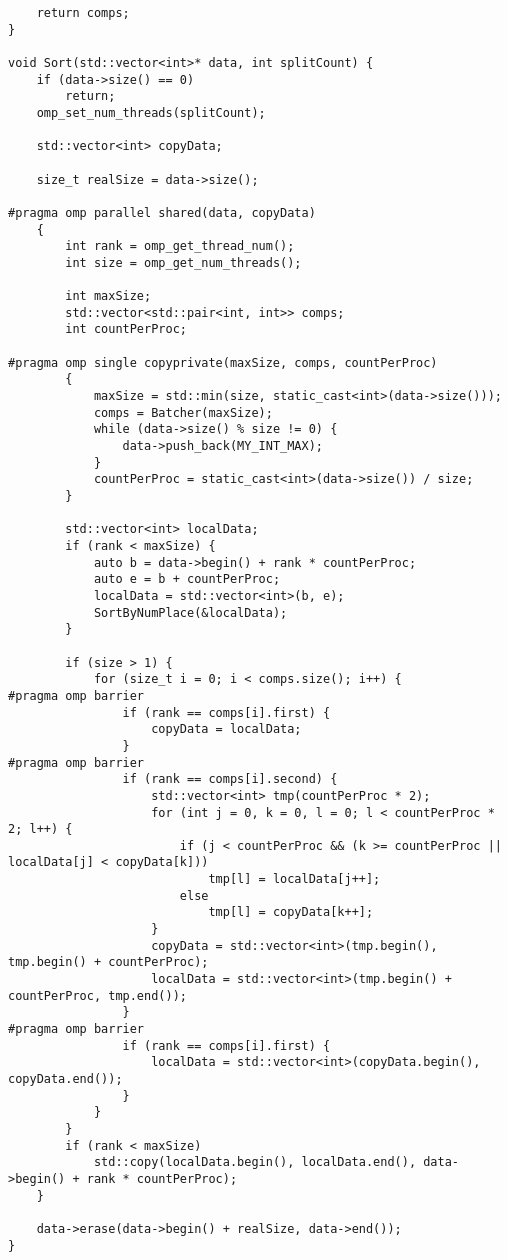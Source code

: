 \documentclass{report}
\begin{document}
\begin{lstlisting}
    return comps;
}

void Sort(std::vector<int>* data, int splitCount) {
    if (data->size() == 0)
        return;
    omp_set_num_threads(splitCount);

    std::vector<int> copyData;

    size_t realSize = data->size();

#pragma omp parallel shared(data, copyData)
    {
        int rank = omp_get_thread_num();
        int size = omp_get_num_threads();

        int maxSize;
        std::vector<std::pair<int, int>> comps;
        int countPerProc;

#pragma omp single copyprivate(maxSize, comps, countPerProc)
        {
            maxSize = std::min(size, static_cast<int>(data->size()));
            comps = Batcher(maxSize);
            while (data->size() % size != 0) {
                data->push_back(MY_INT_MAX);
            }
            countPerProc = static_cast<int>(data->size()) / size;
        }

        std::vector<int> localData;
        if (rank < maxSize) {
            auto b = data->begin() + rank * countPerProc;
            auto e = b + countPerProc;
            localData = std::vector<int>(b, e);
            SortByNumPlace(&localData);
        }

        if (size > 1) {
            for (size_t i = 0; i < comps.size(); i++) {
#pragma omp barrier
                if (rank == comps[i].first) {
                    copyData = localData;
                }
#pragma omp barrier
                if (rank == comps[i].second) {
                    std::vector<int> tmp(countPerProc * 2);
                    for (int j = 0, k = 0, l = 0; l < countPerProc * 2; l++) {
                        if (j < countPerProc && (k >= countPerProc || localData[j] < copyData[k]))
                            tmp[l] = localData[j++];
                        else
                            tmp[l] = copyData[k++];
                    }
                    copyData = std::vector<int>(tmp.begin(), tmp.begin() + countPerProc);
                    localData = std::vector<int>(tmp.begin() + countPerProc, tmp.end());
                }
#pragma omp barrier
                if (rank == comps[i].first) {
                    localData = std::vector<int>(copyData.begin(), copyData.end());
                }
            }
        }
        if (rank < maxSize)
            std::copy(localData.begin(), localData.end(), data->begin() + rank * countPerProc);
    }

    data->erase(data->begin() + realSize, data->end());
}
\end{lstlisting}
\end{document}
